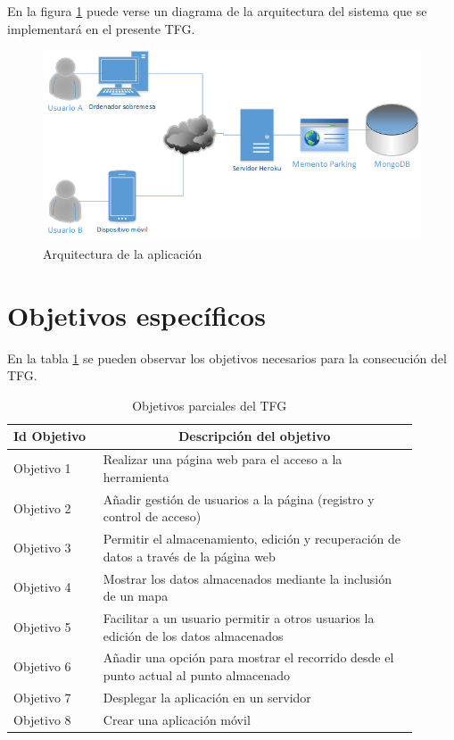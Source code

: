En la figura \ref{fig:arquitectura} puede verse un diagrama de la arquitectura del sistema que se implementará en el presente \ac{TFG}.
\begin{figure}[h!btp]
\centering
\includegraphics[scale=0.75, fbox={\fboxrule} 4mm]{images/02-objetivos/02-arquitectura.png}
\caption{Arquitectura de la aplicación}
\label{fig:arquitectura}
\end{figure}


\section{Objetivos específicos}

En la tabla \ref{tab:objetivos} se pueden observar los objetivos necesarios para la consecución del \ac{TFG}.

\begin{table}[hp]
  \centering 
  \begin{tabular}{p{0.2\linewidth}p{0.7\linewidth}}
    \multicolumn{1}{l}{\cellcolor{black!30}\textbf{Id Objetivo}} & 
 	\multicolumn{1}{c}{\cellcolor{black!30}\textbf{Descripción del objetivo}}\\
    \toprule
    Objetivo 1 & Realizar una página web para el acceso a la herramienta \\
	Objetivo 2 & Añadir gestión de usuarios a la página (registro y control de acceso) \\
	Objetivo 3 & Permitir el almacenamiento, edición y recuperación de datos a través de la página web \\
	Objetivo 4 & Mostrar los datos almacenados mediante la inclusión de un mapa \\
	Objetivo 5 & Facilitar a un usuario permitir a otros usuarios la edición de los datos almacenados \\
	Objetivo 6 & Añadir una opción para mostrar el recorrido desde el punto actual al punto almacenado \\
    Objetivo 7 & Desplegar la aplicación en un servidor \\
    Objetivo 8 & Crear una aplicación móvil \\    
    \hline
  \end{tabular}
  \caption{Objetivos parciales del \ac{TFG}}
  \label{tab:objetivos}
\end{table}


